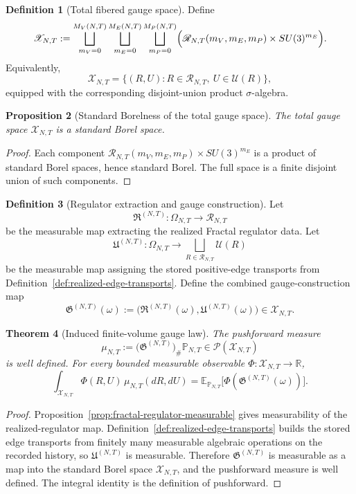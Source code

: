 \documentclass[11pt]{article}
\newtheorem{theorem}{Theorem}[section]
\newtheorem{proposition}[theorem]{Proposition}
\theoremstyle{definition}
\newtheorem{definition}[theorem]{Definition}
\theoremstyle{remark}
\newcommand{\R}{\mathbb R}
\newcommand{\E}{\mathbb E}
\begin{document}
\begin{definition}[Total fibered gauge space]
\label{def:total-fibered-gauge-space}
Define
\[
\mathscr X_{N,T}
:=
\bigsqcup_{m_V=0}^{M_V(N,T)}
\bigsqcup_{m_E=0}^{M_E(N,T)}
\bigsqcup_{m_P=0}^{M_P(N,T)}
\Bigl(\mathscr R_{N,T}(m_V,m_E,m_P)\times SU(3)^{m_E}\Bigr).
\]
Equivalently,
\[
\mathscr X_{N,T}=\{(R,U):R\in \mathscr R_{N,T},\ U\in\mathscr U(R)\},
\]
equipped with the corresponding disjoint-union product \(\sigma\)-algebra.
\end{definition}

\begin{proposition}[Standard Borelness of the total gauge space]
\label{prop:total-gauge-space-standard-borel}
The total gauge space \(\mathscr X_{N,T}\) is a standard Borel space.
\end{proposition}

\begin{proof}
Each component
\(\mathscr R_{N,T}(m_V,m_E,m_P)\times SU(3)^{m_E}\) is a product of standard
Borel spaces, hence standard Borel. The full space is a finite disjoint union
of such components.
\end{proof}

\begin{definition}[Regulator extraction and gauge construction]
\label{def:regulator-extraction-gauge-construction}
Let
\[
\mathfrak R^{(N,T)}:\Omega_{N,T}\to \mathscr R_{N,T}
\]
be the measurable map extracting the realized Fractal regulator data. Let
\[
\mathfrak U^{(N,T)}:\Omega_{N,T}\to \bigsqcup_{R\in\mathscr R_{N,T}}\mathscr U(R)
\]
be the measurable map assigning the stored positive-edge transports from
Definition~\ref{def:realized-edge-transports}. Define the combined
gauge-construction map
\[
\mathfrak G^{(N,T)}(\omega)
:=
\bigl(\mathfrak R^{(N,T)}(\omega),\mathfrak U^{(N,T)}(\omega)\bigr)\in \mathscr X_{N,T}.
\]
\end{definition}

\begin{theorem}[Induced finite-volume gauge law]
\label{thm:induced-finite-volume-gauge-law}
The pushforward measure
\[
\mu_{N,T}:=\bigl(\mathfrak G^{(N,T)}\bigr)_{\#}\mathbb P_{N,T}\in\mathcal P(\mathscr X_{N,T})
\]
is well defined. For every bounded measurable observable
\(\Phi:\mathscr X_{N,T}\to\R\),
\[
\int_{\mathscr X_{N,T}}\Phi(R,U)\,\mu_{N,T}(dR,dU)
=
\E_{\mathbb P_{N,T}}\bigl[\Phi(\mathfrak G^{(N,T)}(\omega))\bigr].
\]
\end{theorem}

\begin{proof}
Proposition~\ref{prop:fractal-regulator-measurable} gives measurability of the
realized-regulator map. Definition~\ref{def:realized-edge-transports} builds
the stored edge transports from finitely many measurable algebraic operations
on the recorded history, so \(\mathfrak U^{(N,T)}\) is measurable. Therefore
\(\mathfrak G^{(N,T)}\) is measurable as a map into the standard Borel space
\(\mathscr X_{N,T}\), and the pushforward measure is well defined. The integral
identity is the definition of pushforward.
\end{proof}
\end{document}
